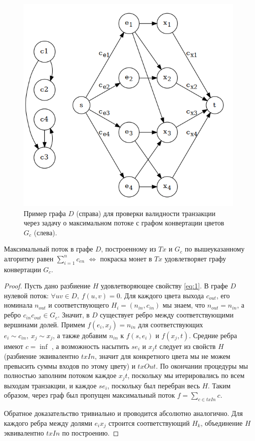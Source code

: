 \documentclass[specification,annotation]{itmo-student-thesis}
\begin{document}
\begin{figure}[h]
  \caption{Пример графа $D$ (справа) для проверки валидности
    транзакции через задачу о максимальном потоке с графом конвертации
    цветов $G_c$ (слева). \label{fig:txgraph1}} \centering
  \includegraphics[scale=0.45]{txgraph1}
\end{figure}

\begin{lemma}
  Максимальный поток в графе $D$, построенному из $Tx$ и $G_c$ по
  вышеуказанному алгоритму равен $\sum_{i=1}^n{c_{en}}$
  $\Leftrightarrow$ покраска монет в $Tx$ удовлетворяет графу
  конвертации $G_c$.
\end{lemma}
\begin{proof}
  Пусть дано разбиение $H$ удовлетворяющее свойству \ref{eq:1}. В
  графе $D$ нулевой поток: $\forall uv \in D, \ f(u,v) = 0$. Для
  каждого цвета выхода $c_{out}$, его номинала $n_{out}$ и
  соответствующего $H_i = (n_{in}, c_{in})$ мы знаем, что $n_{out} =
  n_{in}$, а ребро $c_{in}c_{out} \in G_c$. Значит, в $D$ существует
  ребро между соответствующими вершинами долей. Примем $f(e_i,x_j) =
  n_{in}$ для соответствующих $e_i \sim c_{in}, \ x_j \sim x_j$, а
  также добавим $n_{in}$ к $f(s,e_i)$ и $f(x_j,t)$. Средние ребра
  имеют $c = \inf$ , а возможность насытить $se_i$ и $x_jt$ следует из
  свойств $H$ (разбиение эквивалентно $txIn$, значит для конкретного
  цвета мы не можем превысить суммы входов по этому цвету) и
  $txOut$. По окончании процедуры мы полностью заполним потоком каждое
  $x_jt$, поскольку мы итерировались по всем выходам транзакции, и
  каждое $se_i$, поскольку был перебран весь $H$. Таким образом, через
  граф был пропущен максимальный поток $f = \sum_{c \in txIn}{c}$.

  Обратное доказательство тривиально и проводится абсолютно
  аналогично. Для каждого ребра между долями $e_ix_j$ строится
  соответствующий $H_k$, объединение $H$ эквивалентно $txIn$ по
  построению.
\end{proof}
\end{document}
